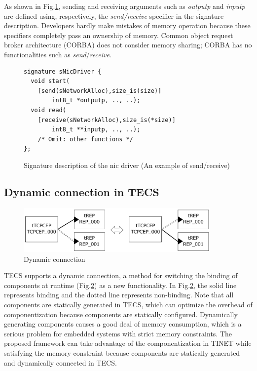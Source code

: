 \documentclass[a4j,12pt,oneside,openany,english]{jsbook}
\begin{document}
As shown in Fig.\ref{src:SendReceive}, sending and receiving arguments such as {\it outputp} and {\it inputp} are defined using, respectively, the {\it send/receive} specifier in the signature description.
Developers hardly make mistakes of memory operation because these specifiers completely pass an ownership of memory.
Common object request broker architecture (CORBA) does not consider memory sharing; CORBA has no functionalities
such as {\it send}/{\it receive}.

\begin{figure}[t]
\centering
\begin{lstlisting}
signature sNicDriver {
  void start(
    [send(sNetworkAlloc),size_is(size)]
        int8_t *outputp, .., ..);
  void read(
    [receive(sNetworkAlloc),size_is(*size)]
        int8_t **inputp, .., ..);
    /* Omit: other functions */
};
\end{lstlisting}
\caption{Signature description of the nic driver (An example of send/receive)}
\label{src:SendReceive}
\end{figure}

\subsection{Dynamic connection in TECS}
\label{sec:DynamicConnection}

\begin{figure}[t]
    \centering
    \includegraphics[width=10cm,clip]{figure/DynamicConnection.pdf}
    \caption{Dynamic connection}
    \label{fig:DynamicConnection}
\end{figure}

TECS supports a dynamic connection, a method for switching the binding of components at runtime (Fig.\ref{fig:DynamicConnection}) as a new functionality.
In Fig.\ref{fig:DynamicConnection}, the solid line represents binding and the dotted line represents non-binding.
Note that all components are statically generated in TECS, which can optimize the overhead of componentization because components are statically configured.
Dynamically generating components causes a good deal of memory consumption, which is a serious problem for embedded systems with strict memory constraints.
The proposed framework can take advantage of the componentization in TINET while satisfying the memory constraint because components are statically generated and dynamically connected in TECS.
\end{document}
